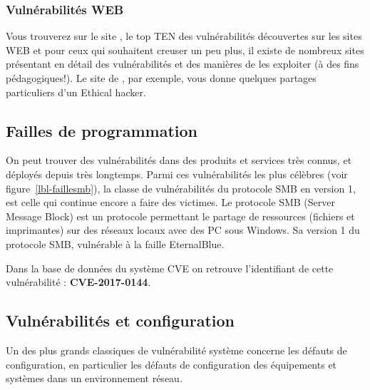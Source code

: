 

\subsubsection{Vulnérabilités WEB}

Vous trouverez sur le site , le top TEN des vulnérabilités découvertes sur les sites WEB
et pour ceux qui souhaitent creuser un peu plus, il existe de nombreux sites présentant en détail des vulnérabilités et des manières de les exploiter (à des fins pédagogiques!). Le site de , par exemple, vous donne quelques partages particuliers d'un Ethical hacker.

\subsection{Failles de programmation}

On peut trouver des vulnérabilités dans des produits et services très connus, et déployés depuis très longtemps. 
Parmi ces vulnérabilités les plus célèbres (voir figure~\ref{lbl-faillesmb}), la classe de vulnérabilités du protocole SMB en version 1, est celle qui continue encore a faire des victimes.
Le protocole SMB (Server Message Block) est un protocole permettant le partage de ressources (fichiers et imprimantes) sur des réseaux locaux avec des PC sous Windows. Sa version 1 du protocole SMB, vulnérable à la faille EternalBlue.

Dans la base de données du système CVE on retrouve l’identifiant de cette vulnérabilité : \textbf{CVE-2017-0144}. 


\subsection{Vulnérabilités et configuration}

Un des plus grands classiques de vulnérabilité système concerne  les défauts de configuration, en particulier les défauts de configuration des équipements et systèmes dans un environnement réseau.

